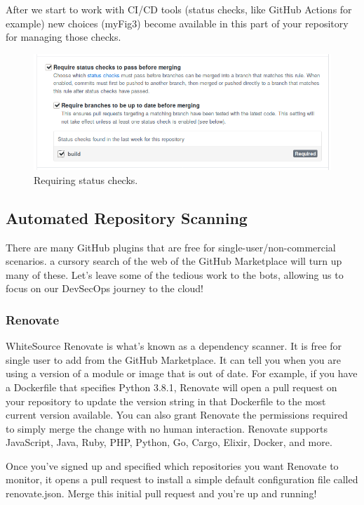 \justify{}
After we start to work with CI/CD tools (status checks, like GitHub
Actions for example) new choices ({myFig3}) become available in this
part of your repository for managing those checks.

\begin{figure}
      \includegraphics[scale=0.53]{images/guthub-status-check.png}
      \caption{Requiring status checks.}
      \label{statuscheck}
\end{figure}

\subsection{Automated Repository Scanning}
\justify{}
There are many GitHub plugins that are free for
single-user/non-commercial scenarios. a cursory search of the web of the
GitHub Marketplace will turn up many of these. Let's leave some of the
tedious work to the bots, allowing us to focus on our DevSecOps journey to the cloud!

\subsubsection{Renovate}
\justify{}
WhiteSource Renovate is what's known as a dependency scanner. It is free
for single user to add from the GitHub Marketplace. It can tell you when you are using
a version of a module or image that
is out of date. For example, if you have a Dockerfile that specifies
Python 3.8.1, Renovate will open a pull request on your repository to
update the version string in that Dockerfile to the most current version
available. You can also grant Renovate the permissions required to
simply merge the change with no human interaction. Renovate supports
JavaScript, Java, Ruby, PHP, Python, Go, Cargo, Elixir, Docker, and
more.

\justify{}
Once you've signed up and specified which repositories you want Renovate
to monitor, it opens a pull request to install a simple default
configuration file called renovate.json. Merge this initial pull request
and you're up and running!

